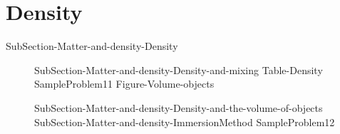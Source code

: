 \documentclass[main.tex]{subfiles}
\newcommand\chapterlabel{Ch-measurements}\setcounter{figurenewcounter}{0}\setcounter{tablenewcounter}{0}\setcounter{formulanewcounter}{0}\chapterpicture{../{\chapterlabel}/figure1}\chapterpicturelabel{PngImg}
\begin{document}
\section{Density}
{SubSection-Matter-and-density-Density}
\sloppy\begin{description}
\item[]{SubSection-Matter-and-density-Density-and-mixing}
{Table-Density} 
{SampleProblem11}
{Figure-Volume-objects}
\item[]{SubSection-Matter-and-density-Density-and-the-volume-of-objects}
{SubSection-Matter-and-density-ImmersionMethod}
{SampleProblem12}
\end{description}




\clearpage\thispagestyle{empty}\mbox{}\clearpage
\end{document}
